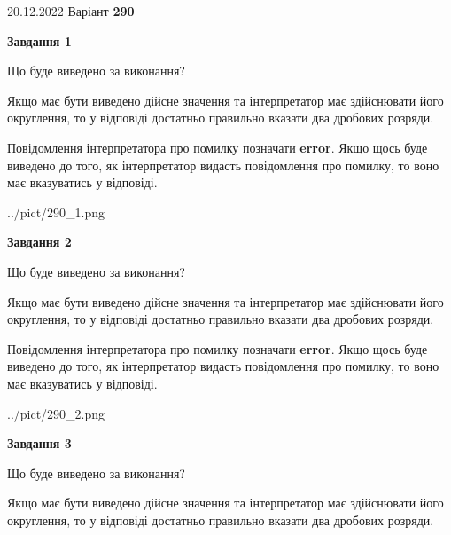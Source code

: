 \documentclass[12pt, ukrainian]{article}
\begin{document}
{20.12.2022 Варіант \No \textbf { 290 }\par}
{
\begin {Large}

{\begin {center}\textbf{Завдання 1}\end {center}}\par
Що буде виведено за виконання? \par

Якщо має бути виведено дійсне значення та інтерпретатор має здійснювати його округлення, 
то у відповіді достатньо правильно вказати два дробових розряди.

Повідомлення інтерпретатора про помилку позначати \textbf{error}.
Якщо щось буде виведено до того, як інтерпретатор видасть повідомлення про помилку, 
то воно має вказуватись у відповіді. \par

\begin{center}
	{../pict/290_1.png}
\end{center}
\newpage

{\begin {center}\textbf{Завдання 2}\end {center}}\par
Що буде виведено за виконання? \par

Якщо має бути виведено дійсне значення та інтерпретатор має здійснювати його округлення, 
то у відповіді достатньо правильно вказати два дробових розряди.

Повідомлення інтерпретатора про помилку позначати \textbf{error}.
Якщо щось буде виведено до того, як інтерпретатор видасть повідомлення про помилку, 
то воно має вказуватись у відповіді. \par

\begin{center}
	{../pict/290_2.png}
\end{center}
\newpage

{\begin {center}\textbf{Завдання 3}\end {center}}\par
Що буде виведено за виконання? \par

Якщо має бути виведено дійсне значення та інтерпретатор має здійснювати його округлення, 
то у відповіді достатньо правильно вказати два дробових розряди.


\end{Large}}
\end{document}
